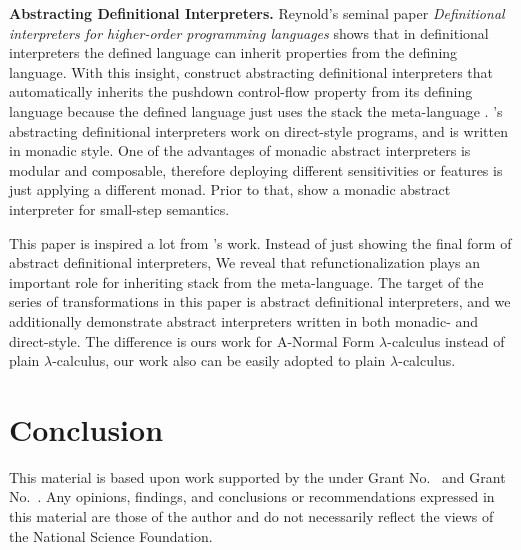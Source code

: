 \documentclass[acmsmall,review,anonymous]{acmart}\settopmatter{printfolios=true,printccs=false,printacmref=false}
\begin{document}
\textbf{Abstracting Definitional Interpreters.}
Reynold's seminal paper \emph{Definitional interpreters for higher-order
  programming languages} \cite{reynolds1972definitional} shows that in
definitional interpreters the defined language can inherit properties from the defining language.
With this insight, \citeauthor{darais2017abstracting} construct abstracting
definitional interpreters that automatically inherits the pushdown control-flow
property from its defining language
because the defined language just uses the stack the meta-language \cite{darais2017abstracting}.
\citeauthor{darais2017abstracting}'s abstracting definitional interpreters work
on direct-style programs, and is written in monadic style. One of the advantages
of monadic abstract interpreters is modular and composable, therefore deploying
different sensitivities or features is just applying a different monad.
Prior to that, \citeauthor{Sergey:2013:MAI:2491956.2491979} show a monadic
abstract interpreter for small-step semantics.

This paper is inspired a lot from \citeauthor{darais2017abstracting}'s work.
Instead of just showing the final form of abstract definitional interpreters,
We reveal that refunctionalization plays an important role for inheriting
stack from the meta-language.
The target of the series of transformations in this paper is abstract definitional
interpreters, and we additionally demonstrate abstract interpreters written in both
monadic- and direct-style.
The difference is ours work for A-Normal Form $\lambda$-calculus instead of plain
$\lambda$-calculus, our work also can be easily adopted to plain
$\lambda$-calculus.

\section{Conclusion}\label{sec:conclusion}

\begin{acks}                            %
  This material is based upon work supported by the
   under Grant
  No.~ and Grant
  No.~.  Any opinions, findings, and
  conclusions or recommendations expressed in this material are those
  of the author and do not necessarily reflect the views of the
  National Science Foundation.
\end{acks}




\end{document}
